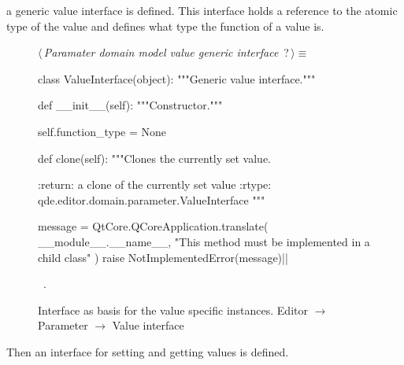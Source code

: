 \documentclass[%
    a4paper,    %
    justified,  %
    nobib,      %
    openany     %
]{tufte-book}
\begin{document}
 a generic value interface is
defined. This interface holds a reference to the atomic type of the value and
defines what type the function of a value is.

\begin{figure}
\begin{flushleft} \small
\begin{minipage}{\linewidth}\label{scrap130}\raggedright\small
{} $\langle\,${\itshape Paramater domain model value generic interface}\nobreak\ {\footnotesize {?}}$\,\rangle\equiv$
\vspace{-1ex}
\begin{pythoncode}
class ValueInterface(object):
    """Generic value interface."""

    def __init__(self):
        """Constructor."""

        self.function_type = None

    def clone(self):
        """Clones the currently set value.

        :return: a clone of the currently set value
        :rtype:  qde.editor.domain.parameter.ValueInterface
        """

        message = QtCore.QCoreApplication.translate(
            __module__.__name__,
            "This method must be implemented in a child class"
        )
        raise NotImplementedError(message)|\NWsep|
\end{pythoncode}
\vspace{1.5ex}
\footnotesize
\begin{list}{}{\setlength{\itemsep}{-\parsep}\setlength{\itemindent}{-\leftmargin}}
\item \NWtxtMacroRefIn\ .

\item{}
\end{list}
\end{minipage}\vspace{4ex}
\end{flushleft}
\caption{Interface as basis for the value specific instances.
  \newline{}\newline{}Editor $\rightarrow$ Parameter $\rightarrow$
  Value interface}
\label{editor:lst:parameter:value-interface}
\end{figure}

Then an interface for setting and getting values is defined.
\end{document}
